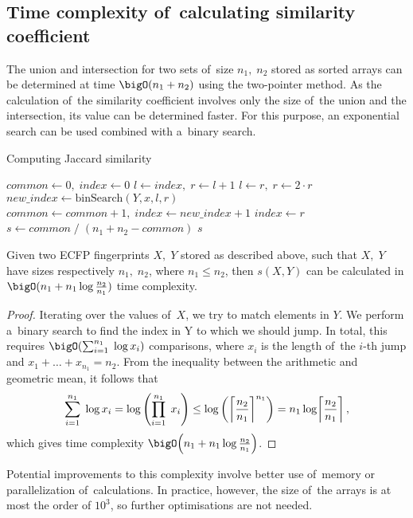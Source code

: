 \subsection{Time complexity of~calculating similarity coefficient}
The union and intersection for two sets of~size \( n_1,\; n_2 \) stored as sorted arrays can be determined at time \( \bigO(n_1 + n_2) \) using the two-pointer method. As the calculation of~the similarity coefficient involves only the size of~the union and the intersection, its value can be determined faster. For this purpose, an exponential search can be used combined with a~binary search.
\begin{algorithm}[H]
    \caption{Computing Jaccard similarity}
    \label{alg:data_struct}
    \begin{algorithmic}[1]
        \State \( common \gets 0,\; index \gets 0 \)
        \State \( l \gets index,\; r \gets l + 1 \)
        \State \( l \gets r,\; r \gets 2 \cdot r \)
        \EndWhile
        \State \( new\_index \gets \text{binSearch}(Y, x, l, r) \)
        \State \( common \gets common + 1,\; index \gets new\_index + 1 \)
        \Else
        \State \( index \gets r \)
        \EndIf
        \EndFor
        \State \( s \gets common \;/\; (n_1 + n_2 - common) \)
        \State \Return \( s \)
    \end{algorithmic}
\end{algorithm}
\begin{propos}
    Given two ECFP fingerprints \(X,\; Y\) stored as described above, such that \( X,\; Y \) have sizes respectively \( n_1,\; n_2 \), where \( n_1 \leq n_2 \), then \( s(X,Y) \) can be calculated in \( \bigO(n_1 + n_1\log\frac{n_2}{n_1}) \) time complexity.
\end{propos}
\begin{proof}
    Iterating over the values of~\( X \), we try to match elements in \( Y \). We perform a~binary search to find the index in Y to which we should jump. In total, this requires \( \bigO\!\pars{\sum_{i=1}^{n_1}\; \log x_i } \) comparisons, where \( x_i \) is the length of~the \( i \)-th jump and \( x_1 + \dots + x_{n_1} = n_2 \). From the inequality between the arithmetic and geometric mean, it follows that
    \[
        \sum_{i=1}^{n_1}\; \log x_i = \log\left( \prod_{i=1}^{n_1}\; x_i \right) \leq \log\left( \left\lceil \frac{n_2}{n_1} \right\rceil^{n_1} \right) = n_1\log\!\left\lceil \frac{n_2}{n_1} \right\rceil,
    \]
    which gives time complexity \( \bigO\!\pars{n_1 + n_1\log\frac{n_2}{n_1}} \).
\end{proof}
Potential improvements to this complexity involve better use of~memory or parallelization of~calculations. In practice, however, the size of~the arrays is at most the order of \( 10^3 \), so further optimisations are not needed.